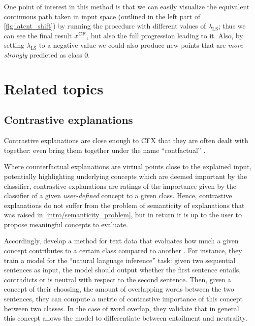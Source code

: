 \documentclass[../main.tex]{subfiles}
\begin{document}
One point of interest in this method is that we can easily visualize the equivalent continuous path taken in input space (outlined in the left part of \autoref{fig:latent_shift}) by running the procedure with different values of $\lambda_\text{LS}$; thus we can see the final result $x^\mathrm{CF}$, but also the full progression leading to it.
Also, by setting $\lambda_\text{LS}$ to a negative value we could also produce new points that are \emph{more strongly} predicted as class 0.


\section{Related topics}

\subsection{Contrastive explanations}

Contrastive explanations are close enough to CFX that they are often dealt with together: \citeauthor{stepinSurvey2021} even bring them together under the name ``contfactual'' \cite{stepinSurvey2021}.

Where counterfactual explanations are virtual points close to the explained input, potentially highlighting underlying concepts which are deemed important by the classifier, contrastive explanations are ratings of the importance given by the classifier of a given \emph{user-defined} concept to a given class.
Hence, contrastive explanations do not suffer from the problem of semanticity of explanations that was raised in \autoref{intro/semanticity_problem}, but in return it is up to the user to propose meaningful concepts to evaluate.

Accordingly, \citeauthor{jacoviContrastive2021} develop a method for text data that evaluates how much a given concept contributes to a certain class compared to another \cite{jacoviContrastive2021}.
For instance, they train a model for the ``natural language inference'' task: given two sequential sentences as input, the model should output whether the first sentence entails, contradicts or is neutral with respect to the second sentence.
Then, given a concept of their choosing, \eg{} the amount of overlapping words between the two sentences, they can compute a metric of contrastive importance of this concept between two classes.
In the case of word overlap, they validate that in general this concept allows the model to differentiate between entailment and neutrality.
\end{document}
